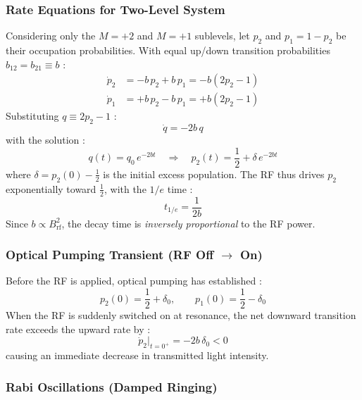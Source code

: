 \subsubsection*{Rate Equations for Two-Level System}
 
Considering only the $M = +2$ and $M = +1$ sublevels, let $p_2$ and $p_1 = 1 - p_2$
be their occupation probabilities. With equal up/down transition probabilities $b_{12} = b_{21} \equiv b$ :
\begin{align}
    \dot{p}_2 &= -b\,p_2 + b\,p_1 = -b(2p_2 - 1) \label{eq:rate2} \\
    \dot{p}_1 &= +b\,p_2 - b\,p_1 = +b(2p_2 - 1) \label{eq:rate1}
\end{align}
Substituting $q \equiv 2p_2 - 1$ :
\begin{equation}
    \dot{q} = -2b\,q
    \label{eq:q_ode}
\end{equation}
with the solution :
\begin{equation}
    q(t) = q_0\,e^{-2bt}
    \quad\Longrightarrow\quad
    p_2(t) = \frac{1}{2} + \delta\,e^{-2bt}
    \label{eq:p2_solution}
\end{equation}
where $\delta = p_2(0) - \tfrac{1}{2}$ is the initial excess population. The RF thus
drives $p_2$ exponentially toward $\tfrac{1}{2}$, with the $1/e$ time :
\begin{equation}
    t_{1/e} = \frac{1}{2b}
    \label{eq:t1e}
\end{equation}
Since $b \propto B_{\text{rf}}^2$, the decay time is \emph{inversely proportional} to
the RF power.
 
\subsubsection*{Optical Pumping Transient (RF Off $\to$ On)}
 
Before the RF is applied, optical pumping has established :
\begin{equation}
    p_2(0) = \frac{1}{2} + \delta_0, \qquad p_1(0) = \frac{1}{2} - \delta_0
    \label{eq:initial_pop}
\end{equation}
When the RF is suddenly switched on at resonance, the net downward transition rate
exceeds the upward rate by :
\begin{equation}
    \dot{p}_2\big|_{t=0^+} = -2b\,\delta_0 < 0
    \label{eq:initial_rate}
\end{equation}
causing an immediate decrease in transmitted light intensity.
 
\subsubsection*{Rabi Oscillations (Damped Ringing)}
 
